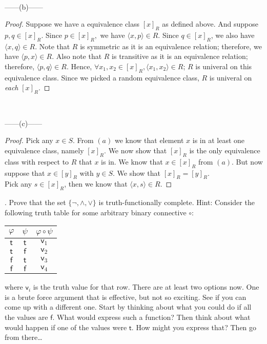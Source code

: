 \documentclass[12pt]{article}
\begin{document}
~~~
\begin{center}
    ------(b)------
\end{center}
\begin{proof}
    Suppose we have a equivalence class $[x]_R$ as defined above. And suppose $p, q \in [x]_R$.
    Since $p \in [x]_R,$ we have $\langle x, p \rangle \in R$. Since $q \in [x]_R$, we also have
    $\langle x,q \rangle \in R$. Note that $R$ is symmetric as it is an equivalence relation;
    therefore, we have $\langle p,x \rangle \in R$. Also note that $R$ is transitive as it is an
    equivalence relation; therefore, $\langle p,q \rangle \in R$. Hence, $\forall x_1, x_2 \in [x]_R, 
    \langle x_1, x_2 \rangle \in R$; $R$ is univeral on this equivalence class. Since we picked a
    random equivalence class, $R$ is univeral on \emph{each} $[x]_R$.
\end{proof}
~~~
\begin{center}
    ------(c)------
\end{center}
\begin{proof}
    Pick any $x \in S$. From $(a)$ we know that element $x$ is in at least one equivalence class, 
    namely $[x]_R$. We now show that $[x]_R$ is the only equivalence class with respect to 
    $R$ that $x$ is in.
    We know that $x \in [x]_R$ from $(a)$. But now suppose that $x \in [y]_R$ with
    $y \in S$. We show that $[x]_R = [y]_R$.\\
    Pick any $s \in [x]_R$, then we know that $\langle x,s \rangle \in R$. 

\end{proof}

\newpage
{}. Prove that the set $\{\neg, \land, \lor\}$ is truth-functionally complete. Hint:
Consider the following truth table for some arbitrary binary connective $\circ$:
\medskip
\begin{center}
\begin{tabular}{cc|c}
$\varphi$ & $\psi$ & $\varphi \circ \psi$ \\ \hline
$\mathsf{t}$ & $\mathsf{t}$ & $\mathsf{v}_1$ \\
$\mathsf{t}$ & $\mathsf{f}$ & $\mathsf{v}_2$ \\
$\mathsf{f}$ & $\mathsf{t}$ & $\mathsf{v}_3$ \\
$\mathsf{f}$ & $\mathsf{f}$ & $\mathsf{v}_4$ \\
\end{tabular}
\end{center}
\medskip
\noindent
where $\mathsf{v}_i$ is the truth value for that row. There are at least two 
options now.  One is a brute force argument that is effective, but not so exciting.
See if you can come up with a different one. Start by thinking about what you could
do if all the values are $\mathsf{f}$. What would express such a function? Then 
think about what would happen if one of the values were $\mathsf{t}$. How might you
express that? Then go from there\dots
\end{document}
